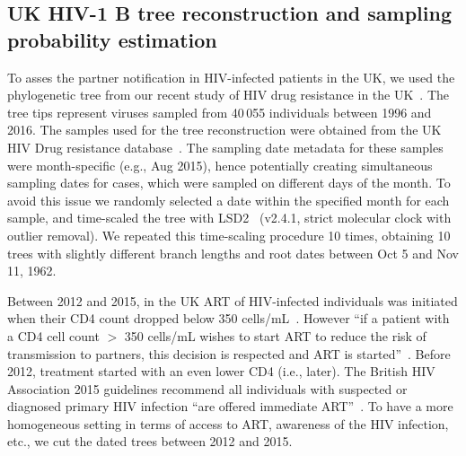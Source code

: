 \documentclass[10pt,letterpaper]{article}
\begin{document}
\subsection*{UK HIV-1 B tree reconstruction and sampling probability estimation}\label{uk_tree}
To asses the partner notification in HIV-infected patients in the UK, we used the phylogenetic tree from our recent study of HIV drug resistance in the UK~\cite{zhukovaModelingDrugResistance2023}. The tree tips represent viruses sampled from 40\,055 individuals between 1996 and 2016. The samples used for the tree reconstruction were obtained from the UK HIV Drug resistance database~\cite{Dunn2007}. The sampling date metadata for these samples were month-specific (e.g., Aug 2015), hence potentially creating simultaneous sampling dates for cases, which were sampled on different days of the month. To avoid this issue we randomly selected a date within the specified month for each sample, and time-scaled the tree with LSD2~\cite{To2016} (v2.4.1, strict molecular clock with outlier removal). We repeated this time-scaling procedure 10 times, obtaining 10 trees with slightly different branch lengths and root dates between Oct 5 and Nov 11, 1962.

Between 2012 and 2015, in the UK ART of HIV-infected individuals  was initiated when their CD4 count dropped below 350 cells/mL~\cite{williamsBritishHIVAssociation2012}. However ``if a patient with a CD4 cell count $>$ 350 cells/mL wishes to start ART to reduce the risk of transmission to partners, this decision is respected and ART is started''~\cite{williamsBritishHIVAssociation2012}. Before 2012, treatment started with an even lower CD4 (i.e., later). The British HIV Association 2015 guidelines recommend all individuals with suspected or diagnosed primary HIV infection ``are offered immediate ART''~\cite{churchillBritishHIVAssociation2016}. To have a more homogeneous setting in terms of access to ART, awareness of the HIV infection, etc., we cut the dated trees between 2012 and 2015. 
\end{document}

